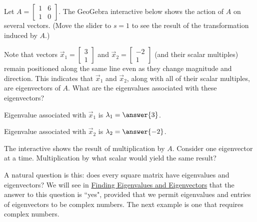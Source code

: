 \documentclass{ximera}
\begin{document}
\begin{exploration}\label{exp:eigenvectors}
Let $A=\begin{bmatrix}1&6\\1&0\end{bmatrix}$.  The GeoGebra interactive below shows the action of $A$ on several vectors.  (Move the slider to $s=1$ to see the result of the transformation induced by $A$.)  
\begin{center}
\end{center}

\begin{question}
Note that vectors $\vec{x}_1=\begin{bmatrix}3\\1\end{bmatrix}$ and $\vec{x}_2=\begin{bmatrix}-2\\1\end{bmatrix}$ (and their scalar multiples) remain positioned along the same line even as they change magnitude and direction.  This indicates that $\vec{x}_1$ and $\vec{x}_2$, along with all of their scalar multiples, are eigenvectors of $A$.  What are the eigenvalues associated with these eigenvectors?

Eigenvalue associated with $\vec{x}_1$ is $\lambda_1=\answer{3}$.

Eigenvalue associated with $\vec{x}_2$ is $\lambda_2=\answer{-2}$.

\begin{hint}
    The interactive shows the result of multiplication by $A$. 
 Consider one eigenvector at a time.  Multiplication by what scalar would yield the same result?
\end{hint}
\end{question}
\end{exploration}


A natural question is this: does every square matrix have eigenvalues and eigenvectors?  We will see in \href{https://ximera.osu.edu/oerlinalg/LinearAlgebra/EIG-0020/main}{Finding Eigenvalues and Eigenvectors} that the answer to this question is ``yes", provided that we permit eigenvalues and entries of eigenvectors to be complex numbers.  The next example is one that requires complex numbers.
\end{document}
